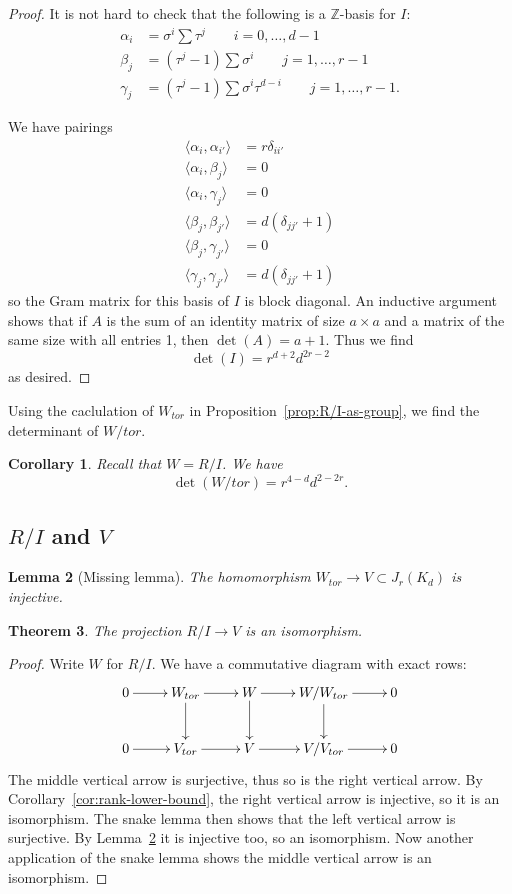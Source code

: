 \documentclass[reqno]{amsart}
\newtheorem{thm}{Theorem}[section]
\newtheorem{cor}[thm]{Corollary}
\newtheorem{lemma}[thm]{Lemma}
\theoremstyle{definition}
\theoremstyle{remark}
\def\Z{\mathbb{Z}}
\begin{document}
\begin{proof}
It is not hard to check that the following is a $\Z$-basis for $I$:
\begin{align*}
\alpha_i&=\sigma^i\sum \tau^j\qquad i=0,\dots,d-1\\
\beta_j&=(\tau^j-1)\sum \sigma^i\qquad j=1,\dots,r-1\\
\gamma_j&=(\tau^j-1)\sum \sigma^i\tau^{d-i}\qquad j=1,\dots,r-1.
\end{align*}

We have pairings 
\begin{align*}
\langle\alpha_i,\alpha_{i'}\rangle&=r\delta_{ii'}\\ 
\langle\alpha_i,\beta_j\rangle&=0\\ 
\langle\alpha_i,\gamma_j\rangle&=0\\ 
\langle\beta_j,\beta_{j'}\rangle&=d(\delta_{jj'}+1)\\ 
\langle\beta_j,\gamma_{j'}\rangle&=0\\
\langle\gamma_j,\gamma_{j'}\rangle&=d(\delta_{jj'}+1)
\end{align*}
so the Gram matrix for this basis of $I$ is block diagonal.  An
inductive argument shows that if $A$ is the sum of an identity matrix
of size $a\times a$ and a matrix of the same size with all entries 1,
then $\det(A)=a+1$.  Thus we find
$$\det(I)=r^{d+2}d^{2r-2}$$
as desired.
\end{proof}

Using the caclulation of $W_{tor}$ in
Proposition~\ref{prop:R/I-as-group}, we find the determinant of
$W/tor$.

\begin{cor}\label{cor:det(W/tor)}
Recall that $W=R/I$.  We have
$$\det(W/tor)=r^{4-d}d^{2-2r}.$$
\end{cor}



\subsection{$R/I$ and $V$}

\begin{lemma}[Missing lemma]\label{lemma:missing}
The homomorphism $W_{tor}\to V\subset J_r(K_d)$ is injective.
\end{lemma}


\begin{thm}
The projection $R/I\to V$ is an isomorphism.
\end{thm}

\begin{proof}
Write $W$ for $R/I$.  We have a commutative diagram with exact rows:
$$\xymatrix{
  0\ar[r]&W_{tor}\ar[r]\ar[d]&W\ar[r]\ar[d]&W/W_{tor}\ar[r]\ar[d]&0\\
  0\ar[r]&V_{tor}\ar[r]&V\ar[r]&V/V_{tor}\ar[r]&0}$$ 
The middle vertical arrow is surjective, thus so is the right vertical
arrow.  By Corollary~\ref{cor:rank-lower-bound}, the right vertical
arrow is injective, so it is an isomorphism.  The snake lemma then
shows that the left vertical arrow is surjective.  By
Lemma~\ref{lemma:missing} it is injective too, so an isomorphism.  Now
another application of the snake lemma shows the middle vertical arrow
is an isomorphism.
\end{proof}
\end{document}
